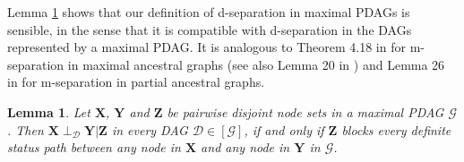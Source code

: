 \documentclass[11pt,a4paper]{article}
\newtheorem{Lemma}[Satz]{Lemma}
\theoremstyle{definition}
\theoremstyle{remark}
\newcommand{\mpdag}{maximal PDAG}
\newcommand{\g}[1][G]{\mathcal{#1}}
\begin{document}
 
 Lemma \ref{lemma:dsepp1} shows that our definition of d-separation in \mpdag{}s is sensible, in the sense that it is compatible with d-separation in the DAGs represented by a \mpdag{}. It is analogous to Theorem 4.18 in \cite{RichardsonSpirtes02} for m-separation in maximal ancestral graphs (see also Lemma 20 in \citealp{zhang2008causal}) and Lemma 26 in \citet{zhang2008causal} for m-separation in partial ancestral graphs. 
 
 
 
 \begin{Lemma} \label{lemma:dsepp1}
 	Let $\mathbf{X}$, $\mathbf{Y}$ and $\mathbf{Z}$ be pairwise disjoint node sets in a \mpdag{} $\g $.
 	Then $\mathbf{X} \perp_{\g[D]} \mathbf{Y} | \mathbf{Z}$ in every DAG $\g[D] \in [\g]$, if and only if $\mathbf{Z}$ blocks every definite status path between any node in $\mathbf{X}$ and any node in $\mathbf{Y}$ in $\g$. 
 \end{Lemma}
 
\end{document}
